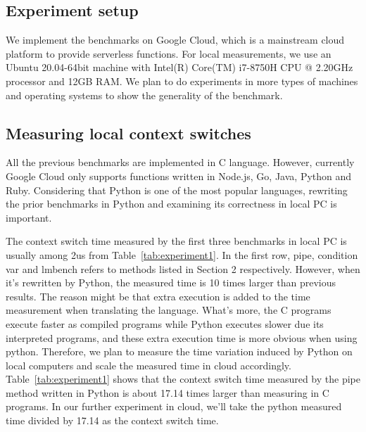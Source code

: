  
\subsection{Experiment setup}

We implement the benchmarks on Google Cloud, which is a mainstream cloud platform to provide serverless functions. 
For local measurements, we use an Ubuntu 20.04-64bit machine with Intel(R) Core(TM) i7-8750H CPU @ 2.20GHz processor and 12GB RAM.
We plan to do experiments in more types of machines and operating systems to show the generality of the benchmark.


\subsection{Measuring local context switches}

All the previous benchmarks\cite{cs-web,cs-datasize,cs-lmbench,cs-pipes} are implemented in C language.
However, currently Google Cloud only supports functions written in Node.js, Go, Java, Python and Ruby.
Considering that Python is one of the most popular languages, rewriting the prior benchmarks in Python and examining its correctness in local PC is important.

The context switch time measured by the first three benchmarks in local PC is usually among 2us from Table~\ref{tab:experiment1}.
In the first row, pipe, condition var and lmbench refers to methods listed in Section 2 respectively.
However, when it's rewritten by Python, the measured time is 10 times larger than previous results. 
The reason might be that extra execution is added to the time measurement when translating the language.
What's more, the C programs execute faster as compiled programs while Python executes slower due its interpreted programs, 
and these extra execution time is more obvious when using python. 
Therefore, we plan to measure the time variation induced by Python on local computers and scale the measured time in cloud accordingly.
Table~\ref{tab:experiment1} shows that the context switch time measured by the pipe method written in Python is about 17.14 times larger than measuring in C programs.
In our further experiment in cloud, we'll take the python measured time divided by 17.14 as the context switch time.

